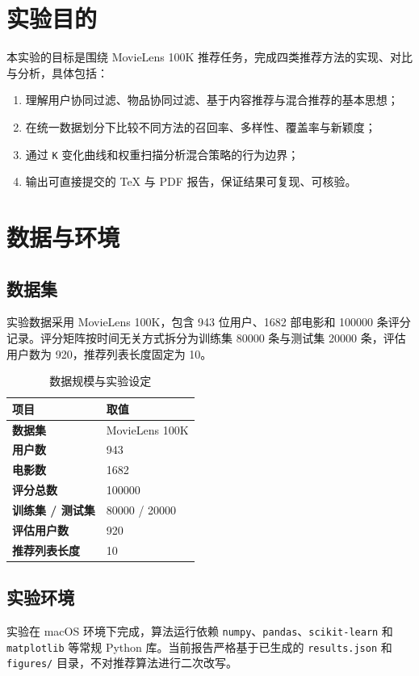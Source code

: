 \documentclass[UTF8,a4paper,12pt,fontset=fandol]{ctexart}
\begin{document}
\section{实验目的}
本实验的目标是围绕 MovieLens 100K 推荐任务，完成四类推荐方法的实现、对比与分析，具体包括：
\begin{enumerate}[leftmargin=2.2em]
    \item 理解用户协同过滤、物品协同过滤、基于内容推荐与混合推荐的基本思想；
    \item 在统一数据划分下比较不同方法的召回率、多样性、覆盖率与新颖度；
    \item 通过 \texttt{K} 变化曲线和权重扫描分析混合策略的行为边界；
    \item 输出可直接提交的 TeX 与 PDF 报告，保证结果可复现、可核验。
\end{enumerate}

\section{数据与环境}
\subsection{数据集}
实验数据采用 MovieLens 100K，包含 943 位用户、1682 部电影和 100000 条评分记录。评分矩阵按时间无关方式拆分为训练集 80000 条与测试集 20000 条，评估用户数为 920，推荐列表长度固定为 10。

\begin{table}[H]
    \centering
    \caption{数据规模与实验设定}
    \small
    \begin{tabularx}{0.92\textwidth}{>{\bfseries}p{4.4cm}X}
        \toprule
        项目 & 取值 \\
        \midrule
        数据集 & MovieLens 100K \\
        用户数 & 943 \\
        电影数 & 1682 \\
        评分总数 & 100000 \\
        训练集 / 测试集 & 80000 / 20000 \\
        评估用户数 & 920 \\
        推荐列表长度 & 10 \\
        \bottomrule
    \end{tabularx}
\end{table}

\subsection{实验环境}
实验在 macOS 环境下完成，算法运行依赖 \texttt{numpy}、\texttt{pandas}、\texttt{scikit-learn} 和 \texttt{matplotlib} 等常规 Python 库。当前报告严格基于已生成的 \texttt{results.json} 和 \texttt{figures/} 目录，不对推荐算法进行二次改写。
\end{document}
